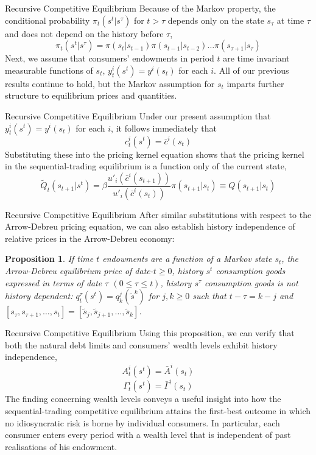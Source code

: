 \documentclass[aspectratio=169,xcolor=dvipsnames]{beamer}
\newtheorem{proposition}{Proposition}
\begin{document}
\begin{frame}{Recursive Competitive Equilibrium}
    Because of the Markov property, the conditional probability $\pi_t(s^t | s^\tau)$ for $t > \tau$ depends only on the state $s_\tau$ at time $\tau$ and does not depend on the history before $\tau$,
    \[
        \pi_t(s^t | s^\tau) = \pi(s_t | s_{t-1}) \pi(s_{t-1} | s_{t-2}) \dots \pi(s_{\tau+1} | s_\tau)
    \]
    Next, we assume that consumers' endowments in period $t$ are time invariant measurable functions of $s_t$, $y^i_t(s^t) = y^i(s_t)$ for each $i$. All of our previous results continue to hold, but the Markov assumption for $s_t$ imparts further structure to equilibrium prices and quantities.
\end{frame}

\begin{frame}{Recursive Competitive Equilibrium}
    Under our present assumption that $y^i_t(s^t) = y^i(s_t)$ for each $i$, it follows immediately that
    \[
        c^i_t(s^t) = \bar c^i(s_t)
    \]
    Substituting these into the pricing kernel equation shows that the pricing kernel in the sequential-trading equilibrium is a function only of the current state,
    \[
        \tilde Q_t(s_{t+1} | s^t) = \beta \frac{u'_i(\bar c^i(s_{t+1}))}{u'_i(\bar c^i(s_t))} \pi(s_{t+1} | s_t) \equiv Q(s_{t+1} | s_t)
    \]
\end{frame}

\begin{frame}{Recursive Competitive Equilibrium}
    After similar substitutions with respect to the Arrow-Debreu pricing equation, we can also establish history independence of relative prices in the Arrow-Debreu economy:

    \begin{proposition}
        If time $t$ endowments are a function of a Markov state $s_t$, the Arrow-Debreu equilibrium price of date-$t \ge 0$, history $s^t$ consumption goods expressed in terms of date $\tau$ $(0 \le \tau \le t)$, history $s^\tau$ consumption goods is not history dependent: $q^\tau_t(s^t) = q^j_k(\tilde s^k)$ for $j, k \ge 0$ such that $t - \tau = k - j$ and $[s_\tau, s_{\tau+1}, \dots, s_t] = [\tilde s_j, \tilde s_{j+1}, \dots, \tilde s_k]$.
    \end{proposition}
\end{frame}

\begin{frame}{Recursive Competitive Equilibrium}
    Using this proposition, we can verify that both the natural debt limits and consumers' wealth levels exhibit history independence,
    \[
        A^i_t(s^t) = \bar A^i(s_t)
    \]
    \[
        \Gamma^i_t(s^t) = \bar \Gamma^i(s_t)
    \]
    The finding concerning wealth levels conveys a useful insight into how the sequential-trading competitive equilibrium attains the first-best outcome in which no idiosyncratic risk is borne by individual consumers. In particular, each consumer enters every period with a wealth level that is independent of past realisations of his endowment.
\end{frame}
\end{document}
